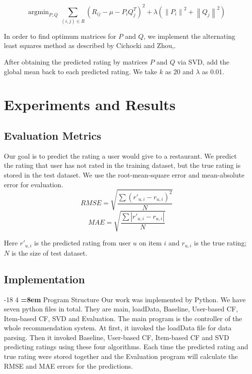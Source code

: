 \documentclass{llncs}
\makeatletter
\DeclareMathOperator*{\argmin}{argmin}
\renewcommand\subsubsection{\@startsection{subsubsection}{3}{\z@}%
	{-18\p@ \@plus -4\p@ \@minus -4\p@}%
	{4\p@ \@plus 2\p@ \@minus 2\p@}%
	{\normalfont\normalsize\bfseries\boldmath
		\rightskip=\z@ \@plus 8em\pretolerance=10000 }}
\makeatother
\begin{document}
\begin{equation}
\argmin_{P,Q}\sum_{(i,j)\in{R}}{(R_{ij} - \mu - P_iQ_{j}^{T})}^2 + \lambda({\left\|P_i\right\|}^2 + {\left\|Q_j\right\|}^2 )
\end{equation}

In order to find optimum matrices for $P$ and $Q$, we implement the alternating least squares method as described by Cichocki and Zhou\cite{abc},\cite{zhou}.

After obtaining the predicted rating by matrices $P$ and $Q$ via SVD, add the global mean back to each predicted rating. We take $k$ as 20 and $\lambda$ as 0.01.

\section{Experiments and Results}
%
\subsection{Evaluation Metrics}
Our goal is to predict the rating a user would give to a restaurant. We predict the rating that user has not rated in the training dataset, but the true rating is stored in the test dataset. We use the root-mean-square error and mean-absolute error for evaluation.
\begin{equation}
\ RMSE = \sqrt{\frac{\sum{\left(r'_{u,i} - r_{u,i}\right)}^2}{N}}
\end{equation}
\begin{equation}
\ MAE = \sqrt{\frac{\sum{\left|r'_{u,i} - r_{u,i}\right|}}{N}}
\end{equation}

Here $r'_{u,i}$ is the predicted rating from user $u$ on item $i$ and $r_{u,i}$ is the true rating; $N$ is the size of test dataset. 
\subsection{Implementation}
\subsubsection{Program Structure}
Our work was implemented by Python. We have seven python files in total. They are main, loadData, Baseline, User-based CF, Item-based CF, SVD and Evaluation. The main program is the controller of the whole recommendation system. At first, it invoked the loadData file for data parsing. Then it invoked Baseline, User-based CF, Item-based CF and SVD predicting ratings using these four algorithms. Each time the predicted rating and true rating were stored together and the Evaluation program will calculate the RMSE and MAE errors for the predictions. 
\end{document}
